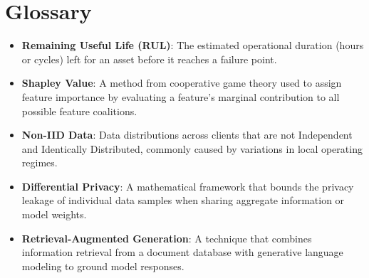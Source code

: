 \documentclass[journal,10pt,compsoc]{IEEEtran}
\begin{document}
\section*{Glossary}
\begin{itemize}
    \item \textbf{Remaining Useful Life (RUL)}: The estimated operational duration (hours or cycles) left for an asset before it reaches a failure point.
    \item \textbf{Shapley Value}: A method from cooperative game theory used to assign feature importance by evaluating a feature's marginal contribution to all possible feature coalitions.
    \item \textbf{Non-IID Data}: Data distributions across clients that are not Independent and Identically Distributed, commonly caused by variations in local operating regimes.
    \item \textbf{Differential Privacy}: A mathematical framework that bounds the privacy leakage of individual data samples when sharing aggregate information or model weights.
    \item \textbf{Retrieval-Augmented Generation}: A technique that combines information retrieval from a document database with generative language modeling to ground model responses.
\end{itemize}
\end{document}
